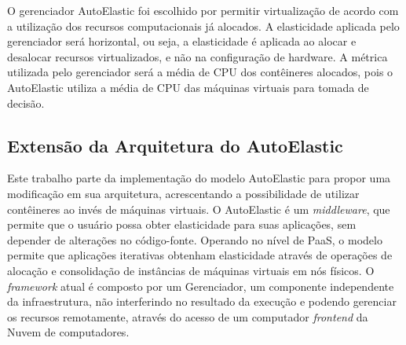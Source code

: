 \documentclass[twoside,english,brazilian]{UNISINOSartigo}
\begin{document}
O gerenciador AutoElastic foi escolhido por permitir virtualização de acordo com a utilização dos recursos computacionais já alocados. A elasticidade aplicada pelo gerenciador será horizontal, ou seja, a elasticidade é aplicada ao alocar e desalocar recursos virtualizados, e não na configuração de hardware. A métrica utilizada pelo gerenciador será a média de CPU dos contêineres alocados, pois o AutoElastic utiliza a média de CPU das máquinas virtuais para tomada de decisão.

\subsection{Extensão da Arquitetura do AutoElastic}
\label{arquitetura}
Este trabalho parte da implementação do modelo AutoElastic para propor uma modificação em sua arquitetura, acrescentando a possibilidade de utilizar contêineres ao invés de máquinas virtuais. O AutoElastic é um \textit{middleware}, que permite que o usuário possa obter elasticidade para suas aplicações, sem depender de alterações no código-fonte. Operando no nível de PaaS, o modelo permite que aplicações iterativas obtenham elasticidade através de operações de alocação e consolidação de instâncias de máquinas virtuais em nós físicos. O \textit{framework} atual é composto por um Gerenciador, um componente independente da infraestrutura, não interferindo no resultado da execução e podendo gerenciar os recursos remotamente, através do acesso de um computador \textit{frontend} da Nuvem de computadores.
\end{document}
